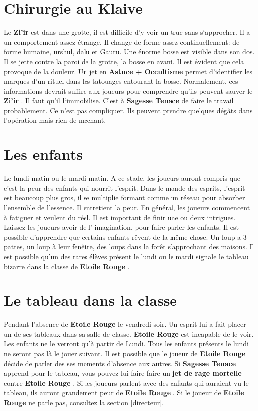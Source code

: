 \documentclass[oneside,12pt]{book}
\newcommand{\Lynn}{\textbf{Etoile Rouge} }
\newcommand{\Jessica}{\textbf{Sagesse Tenace} }
\newcommand{\Thomas}{\textbf{Zi'ir} }
\begin{document}
\begin{flushleft}
\section{Chirurgie au Klaive}
Le \Thomas est dans une grotte, il est difficile d'y voir un truc sans s`approcher. Il a un comportement assez étrange. Il change de forme assez continuellement: de forme humaine, urshul, dalu et Gauru. Une énorme bosse est visible dans son dos. Il se jette contre la paroi de la grotte, la bosse en avant. Il est évident que cela provoque de la douleur.   Un jet en \textbf{Astuce + Occultisme} permet d'identifier les marques d'un rituel dans les tatouages entourant la bosse.
Normalement, ces informations devrait suffire aux joueurs pour comprendre qu'ils peuvent sauver le \Thomas. Il faut qu'il l`immobilise. C'est à \Jessica de faire le travail probablement.
Ce n'est pas compliquer. Ils peuvent prendre quelques dégâts dans l'opération mais rien de méchant. 
  


\section{Les enfants}
Le lundi matin ou le mardi matin.
A ce stade, les joueurs auront compris que c'est la peur des enfants qui nourrit l'esprit.
Dans le monde des esprits, l'esprit est beaucoup plus gros, il se multiplie formant comme un réseau pour absorber l'ensemble de l'essence. Il entretient la peur. En général, les joueurs commencent à fatiguer et veulent du réel. Il est important de finir une ou deux intrigues. Laissez les joueurs avoir de l' imagination, pour faire parler les enfants. Il est possible d'apprendre que certains enfants rêvent de la même chose. 
Un loup a 3 pattes, un loup à leur fenêtre, des loups dans la forêt s'approchant des maisons. Il est possible qu'un des rares élèves présent le lundi ou le mardi signale le tableau bizarre dans la classe de \Lynn . 

\section{Le tableau dans la classe}
Pendant l'absence de \Lynn le vendredi soir. Un esprit lui a fait placer un de ses tableaux dans sa salle de classe. \Lynn est incapable de le voir. Les enfants ne le verront qu'à partir de Lundi. Tous les enfants présents le lundi ne seront pas là le jouer suivant. 
Il est possible que le joueur de \Lynn décide de parler des ses moments d'absence aux autres. 
Si \Jessica apprend pour le tableau, vous pouvez lui faire faire un \textbf{jet de rage mortelle} contre \Lynn . Si les joueurs parlent avec des enfants qui auraient vu le tableau, ils auront grandement peur de \Lynn .
Si le joueur de \Lynn ne parle pas, consultez la section \ref{directeur}.


\end{flushleft}
\end{document}

